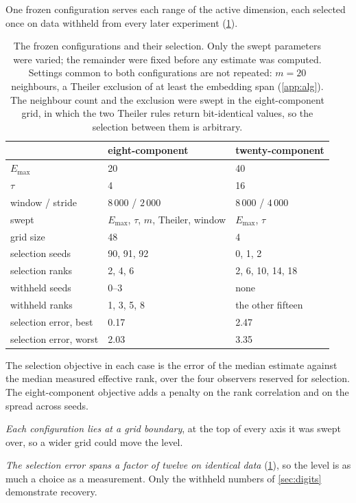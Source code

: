 \documentclass{article}
\begin{document}
One frozen configuration serves each range of the active dimension, each selected once on data
withheld from every later experiment (\cref{tab:frozen}).

\begin{table}[H]
\centering
\caption{The frozen configurations and their selection. Only the swept parameters were varied; the
remainder were fixed before any estimate was computed. Settings common to both configurations are
not repeated: $m = 20$ neighbours, a Theiler exclusion of at least the embedding span
(\cref{app:alg}). The neighbour count and the exclusion were swept in
the eight-component grid, in which the two Theiler rules return bit-identical values, so the
selection between them is arbitrary.}
\label{tab:frozen}
\begin{tabular}{lll}
\toprule
 & eight-component & twenty-component \\
\midrule
$E_{\max}$                & 20 & 40 \\
$\tau$                    & 4 & 16 \\
window / stride           & $8\,000$ / $2\,000$ & $8\,000$ / $4\,000$ \\
\midrule
swept                     & $E_{\max}$, $\tau$, $m$, Theiler, window & $E_{\max}$, $\tau$ \\
grid size                 & 48 & 4 \\
selection seeds           & 90, 91, 92 & 0, 1, 2 \\
selection ranks           & 2, 4, 6 & 2, 6, 10, 14, 18 \\
withheld seeds            & 0--3 & none \\
withheld ranks            & 1, 3, 5, 8 & the other fifteen \\
selection error, best     & 0.17 & 2.47 \\
selection error, worst    & 2.03 & 3.35 \\
\bottomrule
\end{tabular}
\end{table}

The selection objective in each case is the error of the median estimate against the median
measured effective rank, over the four observers reserved for selection. The eight-component
objective adds a penalty on the rank correlation and on the spread
across seeds.

\emph{Each configuration lies at a grid boundary}, at the top of every axis it was swept over, so a
wider grid could move the level.

\emph{The selection error spans a factor of twelve on identical data} (\cref{tab:frozen}), so the
level is as much a choice as a measurement. Only the withheld numbers of \cref{sec:digits}
demonstrate recovery.
\end{document}
